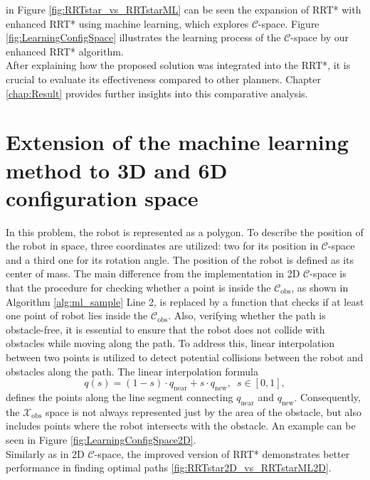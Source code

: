 \documentclass{ctuthesis}
\begin{document}
in Figure \ref{fig:RRTstar_vs_RRTstarML} can be seen 
the expansion of RRT* with enhanced RRT* using 
machine learning, which explores $\mathcal{C}$-space. 
Figure \ref{fig:LearningConfigSpace} illustrates 
the learning process of the $\mathcal{C}$-space by our enhanced RRT* algorithm.
\\[12pt]
After explaining how the proposed solution was integrated into the RRT*, 
it is crucial to evaluate its effectiveness compared to other planners. 
Chapter \ref{chap:Result} provides further insights into this comparative analysis.
\section{Extension of the machine learning method to 3D and 6D configuration space}
In this problem, the robot is represented as a polygon. 
To describe the position of the robot in space, three coordinates are utilized: 
two for its position in $\mathcal{C}$-space and 
a third one for its rotation angle. 
The position of the robot is defined as its center of mass.
The main difference from the implementation in 2D $\mathcal{C}$-space is that 
the procedure for checking whether a point is inside the $\mathcal{C}_\text{obs}$,
as shown in Algorithm \ref{alg:ml_sample} Line 2,
is replaced by a function that checks if 
at least one point of robot lies inside the $\mathcal{C}_\text{obs}$. 
Also, verifying whether the path is obstacle-free, 
it is essential to ensure that 
the robot does not collide with obstacles while moving along the path.
To address this, 
linear interpolation between two points is utilized 
to detect potential collisions between the robot and obstacles along the path.
The linear interpolation formula \[ q(s) = (1 - s) \cdot q_{\text{near}} + s \cdot q_{\text{new}},\enspace s \in [0,1], \] 
defines the points along the line segment connecting \( q_{\text{near}} \) and \( q_{\text{new}} \).
Consequently, the $\mathcal{X}_\text{obs}$ space is not always represented just by the 
area of the obstacle, but also includes points where the robot intersects 
with the obstacle. 
An example can be seen in Figure \ref{fig:LearningConfigSpace2D}.
\\[12pt]
Similarly as in 2D $\mathcal{C}$-space, 
the improved version of RRT* demonstrates better performance 
in finding optimal paths \ref{fig:RRTstar2D_vs_RRTstarML2D}. 
\end{document}
